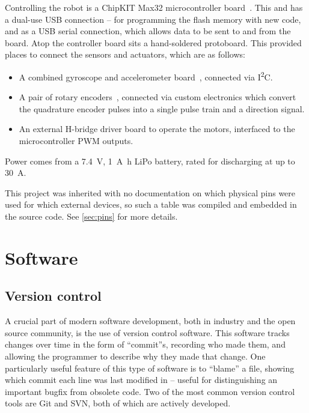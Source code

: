 \documentclass[main.tex]{subfiles}
\begin{document}
	Controlling the robot is a ChipKIT Max32 microcontroller board~\cite{max32}. This and has a dual-use USB connection -- for programming the flash memory with new code, and as a USB serial connection, which allows data to be sent to and from the board. Atop the controller board sits a hand-soldered protoboard. This provided places to connect the sensors and actuators, which are as follows:
	\begin{itemize}[noitemsep]
		\item
			A combined gyroscope and accelerometer board~\cite{imu}, connected via I\textsuperscript{2}C.
		\item
			A pair of rotary encoders~\cite{encoder}, connected via custom electronics which convert the quadrature encoder pulses into a single pulse train and a direction signal.
		\item
			An external H-bridge driver board to operate the motors, interfaced to the microcontroller PWM outputs.
	\end{itemize}
	Power comes from a \SI{7.4}{\volt}, \SI{1}{\ampere\hour}  LiPo battery, rated for discharging at up to \SI{30}{\ampere}.

	This project was inherited with no documentation on which physical pins were used for which external devices, so such a table was compiled and embedded in the source code.
	See \cref{sec:pins} for more details.

\section{Software}

	\subsection{Version control}

	A crucial part of modern software development, both in industry and the open source community, is the use of version control software.
	This software tracks changes over time in the form of \enquote{commit}s, recording who made them, and allowing the programmer to describe why they made that change.
	One particularly useful feature of this type of software is to \enquote{blame} a file, showing which commit each line was last modified in -- useful for distinguishing an important bugfix from obsolete code.
	Two of the most common version control tools are Git and SVN, both of which are actively developed.
\end{document}
